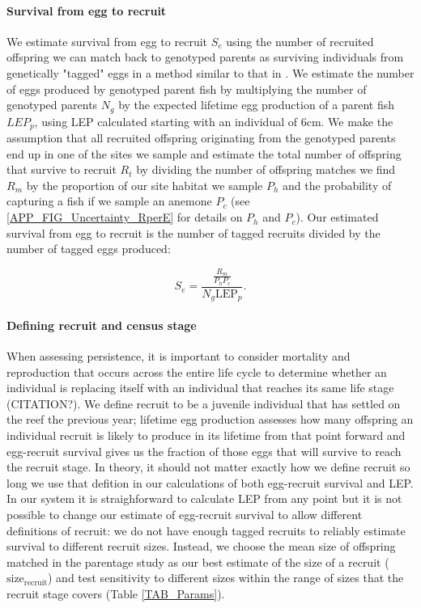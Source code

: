 \documentclass[12pt, oneside]{article}   	%
\begin{document}
\paragraph*{Survival from egg to recruit}

We estimate survival from egg to recruit $S_e$ using the number of recruited offspring we can match back to genotyped parents as surviving individuals from genetically "tagged" eggs in a method similar to that in \cite{johnson2018integrating}. We estimate the number of eggs produced by genotyped parent fish by multiplying the number of genotyped parents $N_g$ by the expected lifetime egg production of a parent fish $LEP_p$, using LEP calculated starting with an individual of 6cm. We make the assumption that all recruited offspring originating from the genotyped parents end up in one of the sites we sample and estimate the total number of offspring that survive to recruit $R_t$ by dividing the number of offspring matches we find $R_m$ by the proportion of our site habitat we sample $P_h$ and the probability of capturing a fish if we sample an anemone $P_c$ (see \ref{APP_FIG_Uncertainty_RperE} for details on $P_h$ and $P_c$). Our estimated survival from egg to recruit is the number of tagged recruits divided by the number of tagged eggs produced:

\begin{equation}
S_e = \frac{\frac{R_m}{P_h P_c}}{N_g \text{LEP}_p}. \label{EQN_EggRecruitSurv}
\end{equation}

\paragraph*{Defining recruit and census stage} %

When assessing persistence, it is important to consider mortality and reproduction that occurs across the entire life cycle to determine whether an individual is replacing itself with an individual that reaches its same life stage (CITATION?). We define recruit to be a juvenile individual that has settled on the reef the previous year; lifetime egg production assesses how many offspring an individual recruit is likely to produce in its lifetime from that point forward and egg-recruit survival gives us the fraction of those eggs that will survive to reach the recruit stage. In theory, it should not matter exactly how we define recruit so long we use that defition in our calculations of both egg-recruit survival and LEP. In our system it is straighforward to calculate LEP from any point but it is not possible to change our estimate of egg-recruit survival to allow different definitions of recruit: we do not have enough tagged recruits to reliably estimate survival to different recruit sizes. Instead, we choose the mean size of offspring matched in the parentage study as our best estimate of the size of a recruit ($\text{size}_\text{recruit}$) and test sensitivity to different sizes within the range of sizes that the recruit stage covers (Table \ref{TAB_Params}).
\end{document}
